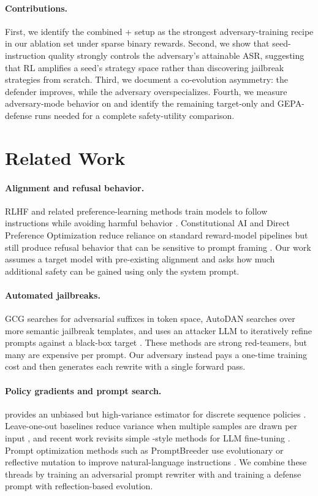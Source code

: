 \paragraph{Contributions.}
First, we identify the combined \rloo{}+\lp{} setup as the strongest adversary-training recipe in our ablation set under sparse binary rewards.
Second, we show that seed-instruction quality strongly controls the adversary's attainable ASR, suggesting that RL amplifies a seed's strategy space rather than discovering jailbreak strategies from scratch.
Third, we document a co-evolution asymmetry: the defender improves, while the adversary overspecializes.
Fourth, we measure adversary-mode behavior on \xstest{} and identify the remaining target-only and GEPA-defense \xstest{} runs needed for a complete safety-utility comparison.
\section{Related Work}

\paragraph{Alignment and refusal behavior.}
RLHF and related preference-learning methods train models to follow instructions while avoiding harmful behavior \citep{christiano2017deep,stiennon2020learning,ouyang2022training}.
Constitutional AI and Direct Preference Optimization reduce reliance on standard reward-model pipelines but still produce refusal behavior that can be sensitive to prompt framing \citep{bai2022constitutional,rafailov2023direct}.
Our work assumes a target model with pre-existing alignment and asks how much additional safety can be gained using only the system prompt.
\paragraph{Automated jailbreaks.}
GCG searches for adversarial suffixes in token space, AutoDAN searches over more semantic jailbreak templates, and \pair{} uses an attacker LLM to iteratively refine prompts against a black-box target \citep{zou2023universal,liu2023autodan,chao2023pair}.
These methods are strong red-teamers, but many are expensive per prompt.
Our adversary instead pays a one-time training cost and then generates each rewrite with a single forward pass.
\paragraph{Policy gradients and prompt search.}
\reinforce{} provides an unbiased but high-variance estimator for discrete sequence policies \citep{williams1992simple}.
Leave-one-out baselines reduce variance when multiple samples are drawn per input \citep{kool2019buy}, and recent work revisits simple \reinforce{}-style methods for LLM fine-tuning \citep{ahmadian2024reinforce}.
Prompt optimization methods such as PromptBreeder use evolutionary or reflective mutation to improve natural-language instructions \citep{fernando2023promptbreeder}.
We combine these threads by training an adversarial prompt rewriter with \rloo{} and training a defense prompt with reflection-based evolution.
